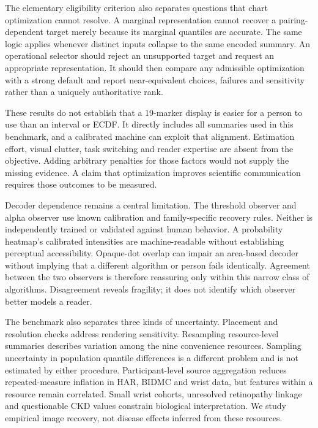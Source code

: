 \documentclass[11pt]{article}
\begin{document}
The elementary eligibility criterion also separates questions that chart optimization cannot resolve. A marginal representation cannot recover a pairing-dependent target merely because its marginal quantiles are accurate. The same logic applies whenever distinct inputs collapse to the same encoded summary. An operational selector should reject an unsupported target and request an appropriate representation. It should then compare any admissible optimization with a strong default and report near-equivalent choices, failures and sensitivity rather than a uniquely authoritative rank.

These results do not establish that a 19-marker display is easier for a person to use than an interval or ECDF. It directly includes all summaries used in this benchmark, and a calibrated machine can exploit that alignment. Estimation effort, visual clutter, task switching and reader expertise are absent from the objective. Adding arbitrary penalties for those factors would not supply the missing evidence. A claim that optimization improves scientific communication requires those outcomes to be measured.

Decoder dependence remains a central limitation. The threshold observer and alpha observer use known calibration and family-specific recovery rules. Neither is independently trained or validated against human behavior. A probability heatmap's calibrated intensities are machine-readable without establishing perceptual accessibility.\cite{crameri2020} Opaque-dot overlap can impair an area-based decoder without implying that a different algorithm or person fails identically. Agreement between the two observers is therefore reassuring only within this narrow class of algorithms. Disagreement reveals fragility; it does not identify which observer better models a reader.

The benchmark also separates three kinds of uncertainty. Placement and resolution checks address rendering sensitivity. Resampling resource-level summaries describes variation among the nine convenience resources. Sampling uncertainty in population quantile differences is a different problem and is not estimated by either procedure. Participant-level source aggregation reduces repeated-measure inflation in HAR, BIDMC and wrist data, but features within a resource remain correlated. Small wrist cohorts, unresolved retinopathy linkage and questionable CKD values constrain biological interpretation. We study empirical image recovery, not disease effects inferred from these resources.
\end{document}

